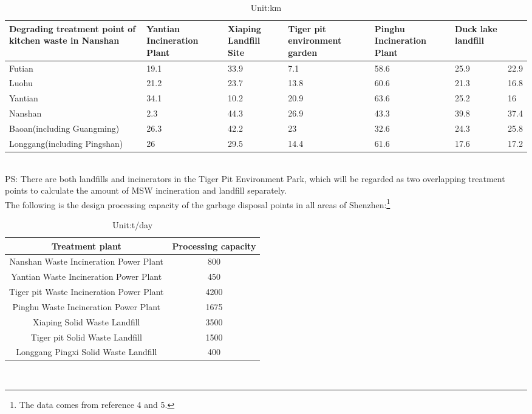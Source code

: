 \documentclass[UTF8]{article}
\begin{document}
\begin{table}[h]
\caption{Unit:km}
\begin{center}
\begin{tabular}{p{4cm}p{2cm}p{2cm}p{2cm}p{2cm}p{2cm}p{2cm}}
\hline
\indent Degrading treatment point of kitchen waste in Nanshan&Yantian Incineration Plant&Xiaping Landfill Site&Tiger pit environment garden&Pinghu Incineration Plant&Duck lake landfill\\
\hline
Futian&19.1&33.9&7.1&58.6&25.9&22.9\\
\hline
Luohu&21.2&23.7&13.8&60.6&21.3&16.8\\
\hline
Yantian&34.1&10.2&20.9&63.6&25.2&16\\
\hline
Nanshan&2.3&44.3&26.9&43.3&39.8&37.4\\
\hline
Baoan(including Guangming)&26.3&42.2&23&32.6&24.3&25.8\\
\hline
Longgang(including Pingshan)&26&29.5&14.4&61.6&17.6&17.2\\
\hline
\end{tabular}
\end{center}
\end{table}\\
\indent PS: There are both landfills and incinerators in the Tiger Pit Environment Park, which will be regarded as two overlapping treatment points to calculate the amount of MSW incineration and landfill separately.\\
\indent The following is the design processing capacity of the garbage disposal points in all areas of Shenzhen:\footnote{The data comes from reference 4 and 5.}\\
\begin{table}[h]
\caption{Unit:t/day}
\begin{center}
\begin{tabular}{cc}
\hline
Treatment plant&Processing capacity\\
\hline
Nanshan Waste Incineration Power Plant&800\\
\hline
Yantian Waste Incineration Power Plant&450\\
\hline
Tiger pit Waste Incineration Power Plant&4200\\
\hline
Pinghu Waste Incineration Power Plant&1675\\
\hline
Xiaping Solid Waste Landfill&3500\\
\hline
Tiger pit Solid Waste Landfill&1500\\
\hline
Longgang Pingxi Solid Waste Landfill&400\\
\hline
\end{tabular}
\end{center}
\end{table}\\
\end{document}
